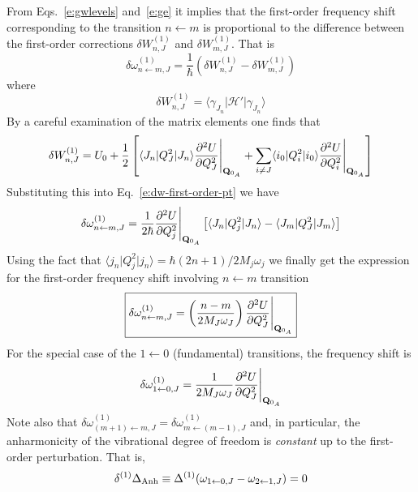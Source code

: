 \documentclass[a4paper,titlepage,twoside,fleqn,12pt]{book}
\begin{document}
\begin{refsection}
From Eqs.~\eqref{e:gwlevels} and~\eqref{e:ge} it implies that 
the first\hyp{}order frequency shift corresponding to the transition
$n\leftarrow m$ 
is proportional to the difference between the first-order corrections 
$\delta W_{n,J}^{(1)}$ and $\delta W_{m,J}^{(1)}$. That is
%
\begin{equation}\label{e:dw-first-order-pt}
\delta \omega_{n\leftarrow m,J}^{(1)} = 
\frac{1}{\hbar} 
\left( \delta W_{n,J}^{(1)} - \delta W_{m,J}^{(1)} \right)
\end{equation}
%
where
%
%
\begin{equation}
\delta W_{n,J}^{(1)} = \langle \gamma_{J_n} \vert \mathscr{H}' \vert \gamma_{J_n} \rangle
\end{equation}
%
By a careful examination of the matrix elements one finds that
%
\begin{equation}
\delta W_{n,J}^{(1)} = U_0 + \frac{1}{2} 
\left[ 
                  \langle J_n \vert Q_J^2 \vert J_n \rangle \frac{\partial^2 U}{\partial Q_J^2} \Bigg|_{{\bf Q}_{0_A}}
  + \sum_{i\ne J} \langle i_0 \vert Q_i^2 \vert i_0 \rangle \frac{\partial^2 U}{\partial Q_i^2} \Bigg|_{{\bf Q}_{0_A}}
\right]
\end{equation}
%
Substituting this into Eq.~\eqref{e:dw-first-order-pt} we have
%
\begin{equation}
\delta \omega_{n\leftarrow m,J}^{(1)} = 
\frac{1}{2\hbar}  \frac{\partial^2 U}{\partial Q_j^2} \Bigg|_{{\bf Q}_{0_A}}
\left[
    \langle J_n \vert Q_j^2 \vert J_n \rangle - \langle J_m \vert Q_J^2 \vert J_m \rangle 
\right]
\end{equation}
%
Using the fact that $\langle j_n \vert Q_j^2 \vert j_n \rangle=\hbar(2n+1)/2M_j\omega_j$
we finally get the expression for the first\hyp{}order frequency shift involving $n\leftarrow m$
transition
%
\begin{equation}  \label{e:buckingham-1st-order}
\boxed{
\delta \omega_{n\leftarrow m,J}^{(1)} = \left( \frac{n-m}{2M_J\omega_J} \right) 
\frac{\partial^2 U}{\partial Q_J^2} \Bigg|_{{\bf Q}_{0_A}}
}
\end{equation}
%
For the special case of the $1\leftarrow 0$ (fundamental) transitions, the frequency
shift is
%
\begin{equation}  \label{e:buckingham-1st-order-fundamental}
\delta \omega_{1\leftarrow 0,J}^{(1)} =  \frac{1}{2M_J\omega_J}
\frac{\partial^2 U}{\partial Q_J^2} \Bigg|_{{\bf Q}_{0_A}}
\end{equation}
%
Note also that $\delta \omega_{(m+1)\leftarrow m,J}^{(1)} = \delta \omega_{m\leftarrow (m-1),J}^{(1)}$
and, in particular, the anharmonicity of the vibrational degree of freedom is \emph{constant}
up to the first\hyp{}order perturbation. That is,
%
\begin{equation}  \label{e:anharm-1st-order}
\delta^{(1)} \Delta_{\rm Anh} \equiv \Delta^{(1)} (\omega_{1\leftarrow 0,J} - \omega_{2\leftarrow 1,J}) = 0
\end{equation}
%


\end{refsection}
\end{document}
